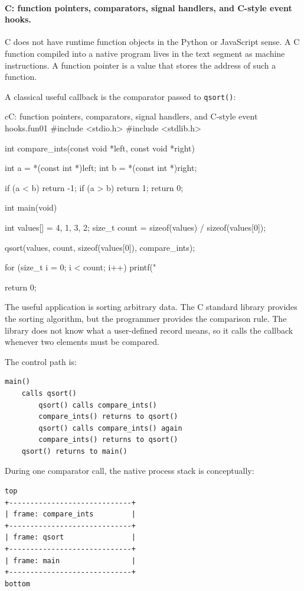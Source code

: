 \documentclass[a4paper,twoside]{report}
\begin{document}
\paragraph{C: function pointers, comparators, signal handlers, and C-style event hooks.}

C does not have runtime function objects in the Python or JavaScript sense. A C function compiled into a native program lives in the text segment as machine instructions. A function pointer is a value that stores the address of such a function.

A classical useful callback is the comparator passed to \texttt{qsort()}:

\begin{codebox}[]{c}{C: function pointers, comparators, signal handlers, and C-style event hooks.}{fun01}
#include <stdio.h>
#include <stdlib.h>

int compare_ints(const void *left, const void *right) {
    int a = *(const int *)left;
    int b = *(const int *)right;

    if (a < b) return -1;
    if (a > b) return 1;
    return 0;
}

int main(void) {
    int values[] = {4, 1, 3, 2};
    size_t count = sizeof(values) / sizeof(values[0]);

    qsort(values, count, sizeof(values[0]), compare_ints);

    for (size_t i = 0; i < count; i++) {
        printf("%
    }

    return 0;
}
\end{codebox}


The useful application is sorting arbitrary data. The C standard library provides the sorting algorithm, but the programmer provides the comparison rule. The library does not know what a user-defined record means, so it calls the callback whenever two elements must be compared.

The control path is:

\begin{verbatim}
main()
    calls qsort()
        qsort() calls compare_ints()
        compare_ints() returns to qsort()
        qsort() calls compare_ints() again
        compare_ints() returns to qsort()
    qsort() returns to main()
\end{verbatim}

During one comparator call, the native process stack is conceptually:

\begin{verbatim}
top
+-----------------------------+
| frame: compare_ints         |
+-----------------------------+
| frame: qsort                |
+-----------------------------+
| frame: main                 |
+-----------------------------+
bottom
\end{verbatim}
\end{document}
